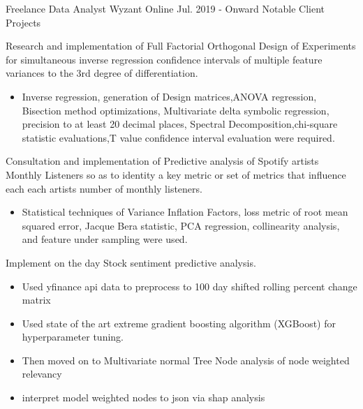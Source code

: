

\begin{cventries}

  \cventry
    {Freelance Data Analyst} %
    {Wyzant} %
    {Online} %
    {Jul. 2019 - Onward} %
    {Notable Client Projects}
    {
      \begin{cvitems} %
        \item {\footnotesize Research and implementation of Full Factorial Orthogonal Design of Experiments for simultaneous inverse regression confidence intervals of multiple feature variances to the 3rd degree of differentiation.}
        \begin{itemize}
            \item {\scriptsize Inverse regression, generation of Design matrices,ANOVA regression, Bisection method optimizations, Multivariate delta symbolic regression, precision to at least 20 decimal places, Spectral Decomposition,chi-square statistic evaluations,T value confidence interval evaluation were required.}
        \end{itemize}
        \item {\footnotesize  Consultation and implementation of Predictive analysis of Spotify artists Monthly Listeners so as to identity a key metric or set of metrics that influence each each artists number of monthly listeners.}
        \begin{itemize}
            \item {\scriptsize Statistical techniques of Variance Inflation Factors, loss metric of root mean squared error, Jacque Bera statistic, PCA regression, collinearity analysis, and feature under sampling were used.}
        \end{itemize}
        \item {\footnotesize  Implement on the day Stock sentiment predictive analysis.}
        \begin{itemize}
            \item {\scriptsize Used yfinance api data to preprocess to 100 day shifted rolling percent change matrix}
            \item {\scriptsize Used state of the art extreme gradient boosting algorithm (XGBoost) for hyperparameter tuning.} 
            \item {\scriptsize Then moved on to Multivariate normal Tree Node analysis of node weighted relevancy}
            \item {\scriptsize interpret model weighted nodes to json via shap analysis}
        \end{itemize}
        

\end{cvitems}}
\end{cventries}
